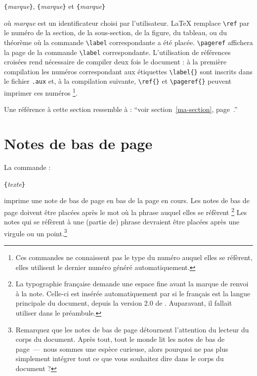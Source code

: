 \begin{lscommand}
\verb|{|\emph{marque}\verb|}|, \verb|{|\emph{marque}\verb|}|
et \verb|{|\emph{marque}\verb|}|
\end{lscommand}
\noindent où \emph{marque} est un identificateur choisi par
l'utilisateur. \LaTeX{} remplace \verb|\ref| par le numéro de la
section, de la sous-section, de la figure, du tableau, ou du théorème
où la commande \verb|\label| correspondante a été
placée. \verb|\pageref| affichera la page de la commande \verb|\label|
correspondante.
L'utilisation de références croisées rend nécessaire de compiler deux fois le
document : à la première compilation les numéros correspondant aux étiquettes
\verb|\label{}| sont inscrits dans le fichier \texttt{.aux} et, à la
compilation suivante, \verb|\ref{}| et \verb|\pageref{}| peuvent imprimer
ces numéros%
\footnote{Ces commandes ne connaissent pas le type du numéro auquel
elles se réfèrent, elles utilisent le dernier numéro généré
automatiquement.}.

\begin{example}
Une référence à cette
section\label{ma-section}
ressemble à :
\enquote{voir
  section~\ref{ma-section},
  page~\pageref{ma-section}.}
\end{example}

\section{Notes de bas de page}
La commande :
\begin{lscommand}
\verb|{|\emph{texte}\verb|}|
\end{lscommand}
\noindent imprime une note de bas de page en bas de la page en cours.
Les notes de bas de page doivent être placées après le mot où la
phrase auquel elles se réfèrent%
\footnote{La typographie française demande une espace fine avant la
marque de renvoi à la note. Celle-ci est insérée automatiquement par
 si le français est la langue principale du document, depuis la
version 2.0 de . Auparavant, il fallait utiliser
 dans le préambule. \NdT}
Les notes qui se réfèrent à une (partie de) phrase devraient être
placées après une virgule ou un point.\footnote{Remarquez que les
  notes de bas de page détournent l'attention du lecteur du corps du
  document. Après tout, tout le monde lit les notes de bas de
  page~---~nous sommes une espèce curieuse, alors pourquoi ne pas plus
  simplement intégrer tout ce que vous souhaitez dire dans le corps du
  document ?\footnotemark}
\nopagebreak[2]

